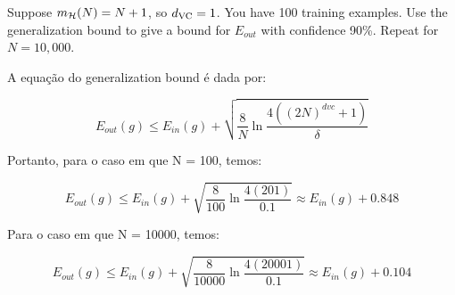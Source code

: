\begin{enunciado}{11}
    Suppose $m_{\mathcal{H}}(N) = N + 1$, so $d_{\text{VC}} = 1$. You have 100 training examples. Use the generalization bound to give a bound for $E_{out}$ with confidence 90\%. Repeat for $N = 10,000$.
\end{enunciado}

A equação do generalization bound é dada por:

\begin{equation*}
    E_{out}(g) \leq E_{in}(g) + \sqrt{\frac{8}{N} \ln{\frac{4 ((2N) ^ {dvc} + 1)} {\delta}}}
\end{equation*}

Portanto, para o caso em que N = 100, temos:

\begin{equation*}
    E_{out}(g) \leq E_{in}(g) + \sqrt{\frac{8}{100} \ln{\frac{4 (201)} {0.1}}}  \approx  E_{in}(g) + 0.848
\end{equation*}

Para o caso em que N = 10000, temos:

\begin{equation*}
    E_{out}(g) \leq E_{in}(g) + \sqrt{\frac{8}{10000} \ln{\frac{4 (20001)} {0.1}}}  \approx  E_{in}(g) + 0.104
\end{equation*}